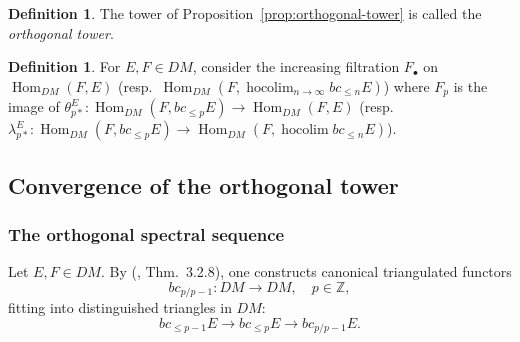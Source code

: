 \documentclass[12pt,a4paper]{article}
\theoremstyle{definition}
\newtheorem{definition}[theorem]{Definition}
\newcommand{\hocolim}{\operatorname*{hocolim}}
\newcommand{\Hom}{\operatorname{Hom}}
\newcommand{\Z}{\mathbb{Z}}
\begin{document}
\begin{definition}\label{def:orthogonal-tower}
The tower of Proposition~\ref{prop:orthogonal-tower} is called the
\emph{orthogonal tower}.
\end{definition}

\begin{definition}\label{def:filtration-F}
For $E,F\in DM$, consider the increasing filtration $F_\bullet$ on
$\Hom_{DM}(F,E)$ (resp.\ $\Hom_{DM}(F,\hocolim_{n\to\infty}bc_{\leq n}E)$)
where $F_p$ is the image of
$\theta_{p*}^E:\Hom_{DM}(F,bc_{\leq p}E)\to\Hom_{DM}(F,E)$
(resp.\ $\lambda_{p*}^E:\Hom_{DM}(F,bc_{\leq p}E)\to\Hom_{DM}(F,\hocolim bc_{\leq n}E)$).
\end{definition}

\subsection{Convergence of the orthogonal tower}

\subsubsection{The orthogonal spectral sequence}\label{sec:orthogonal-SS}

Let $E,F\in DM$.  By (\cite{Pel17}, Thm.\ 3.2.8), one constructs canonical
triangulated functors
\[
  bc_{p/p-1}:DM\longrightarrow DM,\quad p\in\Z,
\]
fitting into distinguished triangles in $DM$:
\[
  bc_{\leq p-1}E\longrightarrow bc_{\leq p}E\longrightarrow bc_{p/p-1}E.
\]
\end{document}
